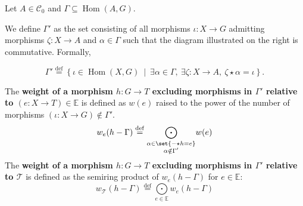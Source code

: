 
\begin{definition}
    \label{def:weight_excluding}
    Let \( A \in \mathcal{C}_0 \) and $\Gamma \subseteq \operatorname{Hom}(A,G)$.
    \newline
    \noindent
    \begin{minipage}{0.6\textwidth}
        We define $\Gamma'$ as the set consisting of all morphisms \( \iota : X \to G \) admitting morphisms \( \zeta \colon X \to A \) and \( \alpha \in \Gamma \) such that the diagram illustrated on the right is commutative. Formally, 
    \end{minipage}
    \begin{minipage}{0.4\textwidth}
        \hfill 
    \end{minipage}

    \[
    \Gamma' \overset{\operatorname{def}}{=} \left\{ \iota \in \operatorname{Hom}(X, G)~\middle|~\exists \alpha \in \Gamma,~\exists \zeta:X \to A,~\zeta \star \alpha = \iota \right\}.
    \]

    \noindent
    The \textbf{weight of a morphism \(h : G \to T\) excluding morphisms in \( \Gamma' \) relative to $(e:X \to T) \in \mathbb{E}$} is defined as $w(e)$ raised to the power of the number of morphisms \( (\iota : X \to G) \notin \Gamma' \).
        \[
        w_e(h - \Gamma) \overset{\operatorname{def}}{=} \underset{
            \substack{\alpha \in \set{- \star h = e} \\
                        \alpha \notin \Gamma'}}{\bigodot} w(e)\] 
        The \textbf{weight of a morphism $h: G \to T$ excluding morphisms in \( \Gamma' \) relative to \(\mathcal{T}\)} is defined as the semiring product of $w_e(h-\Gamma)$ for $e \in \mathbb{E}$:
        \[ 
            w_\mathcal{T}(h-\Gamma) \overset{\operatorname{def}}{=} \underset{e \in \mathbb{E}}{\bigodot} 
        w_e(h-\Gamma)
                \]
\end{definition} 
